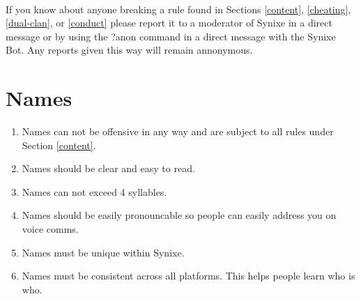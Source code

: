 \documentclass[10pt,a4paper]{article}
\begin{document}
\paragraph{}
If you know about anyone breaking a rule found in Sections \ref{content}, \ref{cheating}, \ref{dual-clan}, or \ref{conduct} please report it to a moderator of Synixe in a direct message or by using the ?anon command in a direct message with the Synixe Bot. Any reports given this way will remain annonymous.
\section{Names}
\begin{enumerate}
	\item Names can not be offensive in any way and are subject to all rules under Section \ref{content}.
	\item Names should be clear and easy to read.
	\item Names can not exceed 4 syllables.
	\item Names should be easily pronouncable so people can easily address you on voice comms.
	\item Names must be unique within Synixe.
	\item Names must be consistent across all platforms. This helps people learn who is who.
\end{enumerate}
\end{document}
